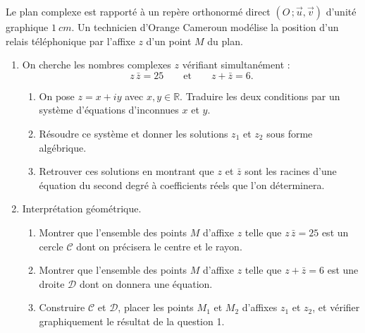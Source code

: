 \documentclass[11pt]{article}
\begin{document}
\begin{exercice}
Le plan complexe est rapporté à un repère orthonormé direct $(O\,;\vec{u},\vec{v})$ d'unité graphique $\SI{1}{cm}$. Un technicien d'Orange Cameroun modélise la position d'un relais téléphonique par l'affixe $z$ d'un point $M$ du plan.
\begin{enumerate}
\item On cherche les nombres complexes $z$ vérifiant simultanément :
\[ z\,\bar{z} = 25 \qquad \text{et} \qquad z + \bar{z} = 6. \]
\begin{enumerate}
\item On pose $z = x + iy$ avec $x, y \in \mathbb{R}$. Traduire les deux conditions par un système d'équations d'inconnues $x$ et $y$.
\item Résoudre ce système et donner les solutions $z_1$ et $z_2$ sous forme algébrique.
\item Retrouver ces solutions en montrant que $z$ et $\bar{z}$ sont les racines d'une équation du second degré à coefficients réels que l'on déterminera.
\end{enumerate}
\item Interprétation géométrique.
\begin{enumerate}
\item Montrer que l'ensemble des points $M$ d'affixe $z$ telle que $z\,\bar{z} = 25$ est un cercle $\mathcal{C}$ dont on précisera le centre et le rayon.
\item Montrer que l'ensemble des points $M$ d'affixe $z$ telle que $z + \bar{z} = 6$ est une droite $\mathcal{D}$ dont on donnera une équation.
\item Construire $\mathcal{C}$ et $\mathcal{D}$, placer les points $M_1$ et $M_2$ d'affixes $z_1$ et $z_2$, et vérifier graphiquement le résultat de la question 1.
\end{enumerate}
\end{enumerate}
\end{exercice}
\end{document}
